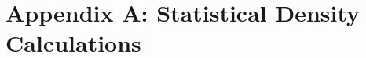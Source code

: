\documentclass[../dissertation.tex]{subfiles}
\begin{document}
\section{Appendix A: Statistical Density Calculations}
\end{document}
